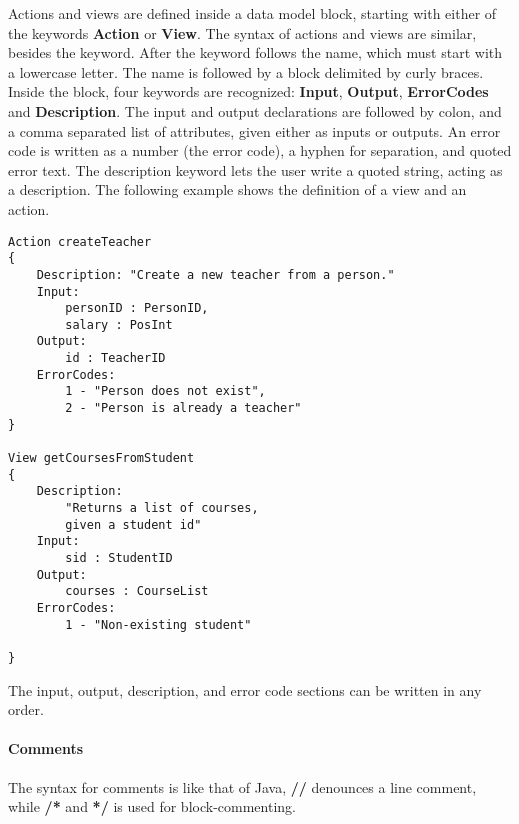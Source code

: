 Actions and views are defined inside a data model block, starting
with either of the keywords \textbf{Action} or \textbf{View}. The
syntax of actions and views are similar, besides the keyword. After
the keyword follows the name, which must start with a lowercase letter.
The name is followed by a block delimited by curly braces. Inside
the block, four keywords are recognized: \textbf{Input}, \textbf{Output},
\textbf{ErrorCodes} and \textbf{Description}. The input and output
declarations are followed by colon, and a comma separated list of
attributes, given either as inputs or outputs. An error code is written
as a number (the error code), a hyphen for separation, and quoted
error text. The description keyword lets the user write a quoted string,
acting as a description. The following example shows the definition
of a view and an action.

\begin{lstlisting}[language=edma]
Action createTeacher
{
	Description: "Create a new teacher from a person."
	Input: 
		personID : PersonID,
		salary : PosInt
	Output:
		id : TeacherID
	ErrorCodes:
		1 - "Person does not exist",
		2 - "Person is already a teacher"
}

View getCoursesFromStudent
{
	Description:
		"Returns a list of courses, 
		given a student id"
	Input:
		sid : StudentID
	Output:
		courses : CourseList
	ErrorCodes:
		1 - "Non-existing student"
	
}
\end{lstlisting}The input, output, description, and error code sections can be written
in any order.


\paragraph{Comments}

The syntax for comments is like that of Java, \textbf{//} denounces
a line comment, while \textbf{/{*}} and \textbf{{*}/} is used for
block-commenting.
